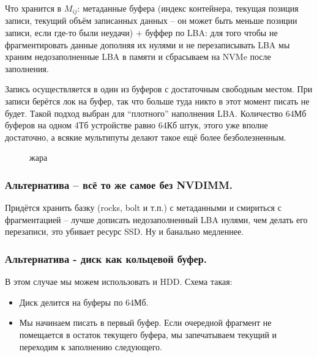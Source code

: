 Что хранится в \(M_{ij}\): метаданные буфера (индекс контейнера, текущая
позиция записи, текущий объём записанных данных -- он может быть меньше
позиции записи, если где-то были неудачи) + буффер по LBA: для того
чтобы не фрагментировать данные дополняя их нулями и не перезаписывать
LBA мы храним недозаполненные LBA в памяти и сбрасываем на NVMe после
заполнения.

Запись осуществляется в один из буферов с достаточным свободным местом.
При записи берётся лок на буфер, так что больше туда никто в этот момент
писать не будет. Такой подход выбран для ``плотного'' наполнения LBA.
Количество 64Мб буферов на одном 4Тб устройстве равно 64Кб штук, этого
уже вполне достаточно, а всякие мультипуты делают такое ещё более
безболезненным.

\begin{figure}
\centering
\pandocbounded{}
\caption{жара}
\end{figure}

\subsubsection{Альтернатива -- всё то же самое без
NVDIMM.}\label{ux430ux43bux44cux442ux435ux440ux43dux430ux442ux438ux432ux430-ux432ux441ux451-ux442ux43e-ux436ux435-ux441ux430ux43cux43eux435-ux431ux435ux437-nvdimm.}

Придётся хранить базку (rocks, bolt и т.п.) с метаданными и смириться с
фрагментацией -- лучше дописать недозаполненный LBA нулями, чем делать
его перезаписи, это убивает ресурс SSD. Ну и банально медленнее.

\subsubsection{Альтернатива - диск как кольцевой
буфер.}\label{ux430ux43bux44cux442ux435ux440ux43dux430ux442ux438ux432ux430---ux434ux438ux441ux43a-ux43aux430ux43a-ux43aux43eux43bux44cux446ux435ux432ux43eux439-ux431ux443ux444ux435ux440.}

В этом случае мы можем использовать и HDD. Схема такая:

\begin{itemize}
\tightlist
\item
  Диск делится на буферы по 64Мб.
\item
  Мы начинаем писать в первый буфер. Если очередной фрагмент не
  помещается в остаток текущего буфера, мы запечатываем текущий и
  переходим к заполнению следующего.
\end{itemize}

